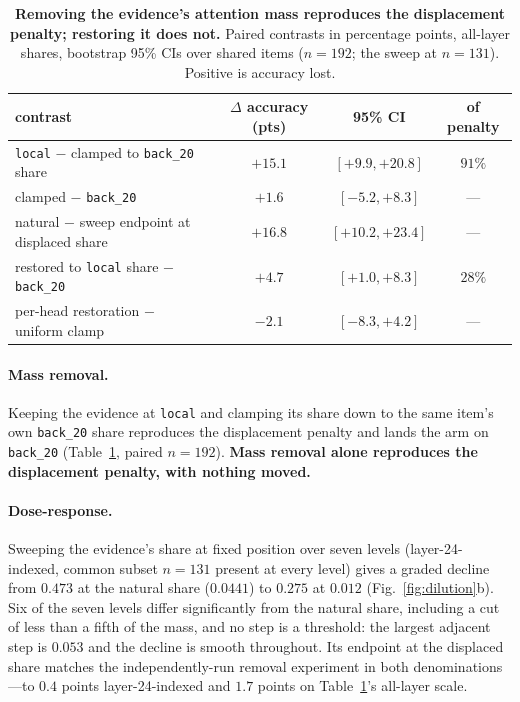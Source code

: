 \documentclass{article}
\begin{document}
\begin{table}[t]
  \centering\small
  \caption{\textbf{Removing the evidence's attention mass reproduces the displacement penalty;
  restoring it does not.} Paired contrasts in percentage points, all-layer shares, bootstrap
  95\% CIs over shared items ($n{=}192$; the sweep at $n{=}131$). Positive is accuracy lost.}
  \label{tab:mass}
  \setlength{\tabcolsep}{5pt}
  \begin{tabular}{lccc}
    \toprule
    contrast & $\Delta$ accuracy (pts) & 95\% CI & of penalty\\
    \midrule
    \texttt{local} $-$ clamped to \texttt{back\_20} share & $\mathbf{+15.1}$ & $[+9.9,+20.8]$ & $91\%$\\
    clamped $-$ \texttt{back\_20} & $+1.6$ & $[-5.2,+8.3]$ & ---\\
    natural $-$ sweep endpoint at displaced share & $+16.8$ & $[+10.2,+23.4]$ & ---\\
    restored to \texttt{local} share $-$ \texttt{back\_20} & $\mathbf{+4.7}$ & $[+1.0,+8.3]$ & $28\%$\\
    per-head restoration $-$ uniform clamp & $-2.1$ & $[-8.3,+4.2]$ & ---\\
    \bottomrule
  \end{tabular}
\end{table}

\paragraph{Mass removal.}
Keeping the evidence at \texttt{local} and clamping its share down to the same item's own
\texttt{back\_20} share reproduces the displacement penalty and lands the arm on
\texttt{back\_20} (Table~\ref{tab:mass}, paired $n{=}192$). \textbf{Mass removal alone
reproduces the displacement penalty, with nothing moved.}

\paragraph{Dose-response.}
Sweeping the evidence's share at fixed position over seven levels (layer-24-indexed, common
subset $n{=}131$ present
at every level) gives a graded decline from $0.473$ at the natural share ($0.0441$) to $0.275$ at
$0.012$ (Fig.~\ref{fig:dilution}b). Six of the seven levels differ significantly from the natural
share, including a cut of less than a fifth of the mass, and no step is a threshold: the largest
adjacent step is $0.053$ and the decline is smooth throughout. Its endpoint at the displaced
share matches the independently-run removal experiment in both denominations---to $0.4$
points layer-24-indexed and $1.7$ points on Table~\ref{tab:mass}'s all-layer scale.
\end{document}
